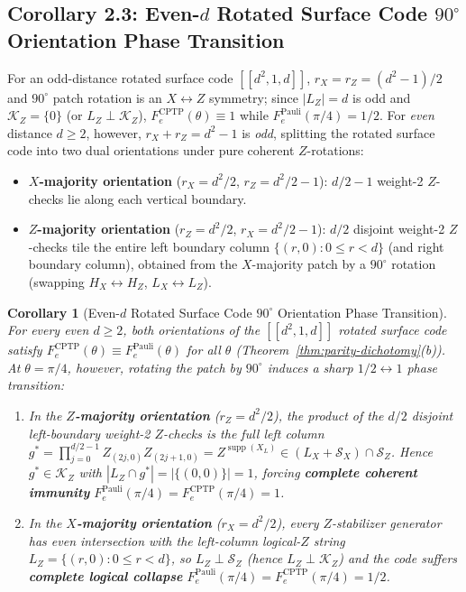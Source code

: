 \documentclass[11pt,a4paper]{article}
\theoremstyle{plain}
\newtheorem{corollary}[theorem]{Corollary}
\theoremstyle{definition}
\newcommand{\SZ}{\mathcal{S}_Z}
\newcommand{\SX}{\mathcal{S}_X}
\newcommand{\KZ}{\mathcal{K}_Z}
\newcommand{\supp}{\operatorname{supp}}
\begin{document}
\subsection{Corollary 2.3: Even-\texorpdfstring{$d$}{d} Rotated Surface Code \texorpdfstring{$90^\circ$}{90-degree} Orientation Phase Transition}

For an odd-distance rotated surface code $[[d^2, 1, d]]$, $r_X = r_Z = (d^2-1)/2$ and $90^\circ$ patch rotation is an $X \leftrightarrow Z$ symmetry; since $|L_Z| = d$ is odd and $\KZ = \{0\}$ (or $L_Z \perp \KZ$), $F_e^{\mathrm{CPTP}}(\theta) \equiv 1$ while $F_e^{\mathrm{Pauli}}(\pi/4) = 1/2$. For \emph{even} distance $d \ge 2$, however, $r_X + r_Z = d^2 - 1$ is \emph{odd}, splitting the rotated surface code into two dual orientations under pure coherent $Z$-rotations:
\begin{itemize}[leftmargin=1.5em,itemsep=2pt]
  \item \textbf{$X$-majority orientation} ($r_X = d^2/2$, $r_Z = d^2/2 - 1$): $d/2 - 1$ weight-2 $Z$-checks lie along each vertical boundary.
  \item \textbf{$Z$-majority orientation} ($r_Z = d^2/2$, $r_X = d^2/2 - 1$): $d/2$ disjoint weight-2 $Z$-checks tile the entire left boundary column $\{(r,0) : 0 \le r < d\}$ (and right boundary column), obtained from the $X$-majority patch by a $90^\circ$ rotation (swapping $H_X \leftrightarrow H_Z$, $L_X \leftrightarrow L_Z$).
\end{itemize}

\begin{corollary}[Even-$d$ Rotated Surface Code $90^\circ$ Orientation Phase Transition]
\label{cor:even-d-orientation}
For every even $d \ge 2$, both orientations of the $[[d^2, 1, d]]$ rotated surface code satisfy $F_e^{\mathrm{CPTP}}(\theta) \equiv F_e^{\mathrm{Pauli}}(\theta)$ for all $\theta$ (Theorem~\ref{thm:parity-dichotomy}(b)). At $\theta = \pi/4$, however, rotating the patch by $90^\circ$ induces a sharp $1/2 \leftrightarrow 1$ phase transition:
\begin{enumerate}[label=(\alph*),leftmargin=1.8em,itemsep=2pt]
  \item In the \textbf{$Z$-majority orientation} ($r_Z = d^2/2$), the product of the $d/2$ disjoint left-boundary weight-2 $Z$-checks is the full left column $g^* = \prod_{j=0}^{d/2-1} Z_{(2j,0)} Z_{(2j+1,0)} = Z^{\supp(X_L)} \in (L_X + \SX) \cap \SZ$. Hence $g^* \in \KZ$ with $|L_Z \cap g^*| = |\{(0,0)\}| = 1$, forcing \textbf{complete coherent immunity} $F_e^{\mathrm{Pauli}}(\pi/4) = F_e^{\mathrm{CPTP}}(\pi/4) = 1$.
  \item In the \textbf{$X$-majority orientation} ($r_X = d^2/2$), every $Z$-stabilizer generator has even intersection with the left-column logical-$Z$ string $L_Z = \{(r,0) : 0 \le r < d\}$, so $L_Z \perp \SZ$ (hence $L_Z \perp \KZ$) and the code suffers \textbf{complete logical collapse} $F_e^{\mathrm{Pauli}}(\pi/4) = F_e^{\mathrm{CPTP}}(\pi/4) = 1/2$.
\end{enumerate}
\end{corollary}
\end{document}
